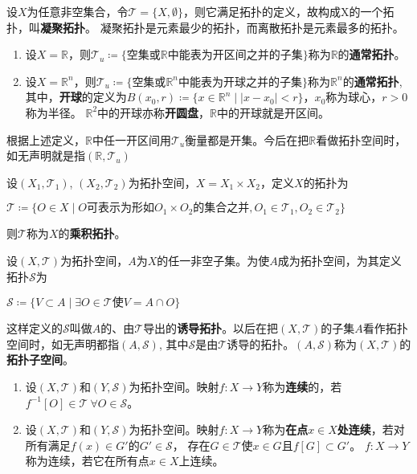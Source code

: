 \begin{example}
	设$X$为任意非空集合，令$\mathscr{T} = \{X, \emptyset\}$，则它满足拓扑的定义，故构成X的一个拓扑，叫\textbf{凝聚拓扑}。
	凝聚拓扑是元素最少的拓扑，而离散拓扑是元素最多的拓扑。
\end{example}

\begin{example}
	\begin{enumerate}[（1）]
		\item 设$X = \mathbb{R}$，则$\mathscr{T}_u \coloneq \{\text{空集或}\mathbb{R}\text{中能表为开区间之并的子集}\}$称为$\mathbb{R}$的\textbf{通常拓扑}。
		\item 设$X = \mathbb{R}^n$，则$\mathscr{T}_u \coloneq \{\text{空集或}\mathbb{R}^n\text{中能表为开球之并的子集}\}$称为$\mathbb{R}^n$的\textbf{通常拓扑},
		      其中，\textbf{开球}的定义为$B(x_0, r) \coloneq \{x \in \mathbb{R}^n \mid |x - x_0| < r\}$，$x_0$称为球心，$r > 0$称为半径。
		      $\mathbb{R}^2$中的开球亦称\textbf{开圆盘}，$\mathbb{R}$中的开球就是开区间。
	\end{enumerate}
	根据上述定义，$\mathbb{R}$中任一开区间用$\mathscr{T}_u$衡量都是开集。今后在把$\mathbb{R}$看做拓扑空间时，如无声明就是指$(\mathbb{R}, \mathscr{T}_u)$
\end{example}

\begin{example}
	设$(X_1, \mathscr{T}_1)$, $(X_2, \mathscr{T}_2)$为拓扑空间，$X = X_1 \times X_2$，定义$X$的拓扑为

	$\mathscr{T} \coloneq \{O \in X \mid O\text{可表示为形如}O_1 \times O_2\text{的集合之并}, O_1 \in \mathscr{T}_1, O_2 \in \mathscr{T}_2\}$

	则$\mathscr{T}$称为$X$的\textbf{乘积拓扑}。
\end{example}

\begin{example}
	设$(X, \mathscr{T})$为拓扑空间，$A$为$X$的任一非空子集。为使$A$成为拓扑空间，为其定义拓扑$\mathscr{S}$为

	$\mathscr{S} \coloneq \{V \subset A \mid \exists O \in \mathscr{T} \text{使} V = A \cap O\}$

	这样定义的$\mathscr{S}$叫做$A$的、由$\mathscr{T}$导出的\textbf{诱导拓扑}。以后在把$(X, \mathscr{T})$的子集$A$看作拓扑空间时，如无声明都指$(A, \mathscr{S})$,
	其中$\mathscr{S}$是由$\mathscr{T}$诱导的拓扑。$(A, \mathscr{S})$称为$(X, \mathscr{T})$的\textbf{拓扑子空间}。
\end{example}

\begin{definition}
	\begin{enumerate}[（a）]
		\item 设$(X, \mathscr{T})$和$(Y, \mathscr{S})$为拓扑空间。映射$f \colon X \to Y$称为\textbf{连续}的，若$f^{-1}[O] \in \mathscr{T} ~ \forall O \in \mathscr{S}$。
		\item 设$(X, \mathscr{T})$和$(Y, \mathscr{S})$为拓扑空间。映射$f \colon X \to Y$称为\textbf{在点$x \in X$处连续}，若对所有满足$f(x) \in G'$的$G' \in \mathscr{S}$， 存在$G \in \mathscr{T}$使$x \in G$且$f[G] \subset G'$。
		      $f \colon X \to Y$称为连续，若它在所有点$x \in X$上连续。
	\end{enumerate}
\end{definition}

